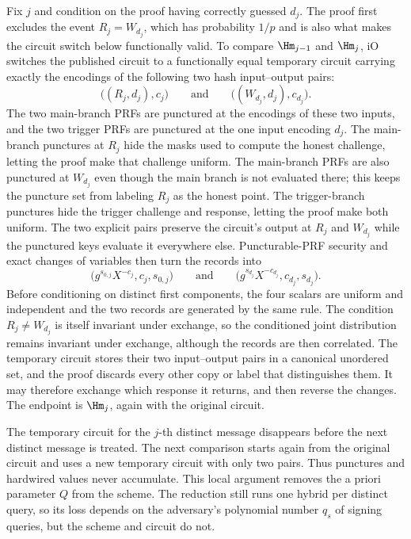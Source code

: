 Fix $j$ and condition on the proof having correctly guessed $d_j$. The proof first excludes the event $R_j=W_{d_j}$, which has probability $1/p$ and is also what makes the circuit switch below functionally valid. To compare $\Hm_{j-1}$ and $\Hm_j$, iO switches the published circuit to a functionally equal temporary circuit carrying exactly the encodings of the following two hash input--output pairs:
$$
\big((R_j,d_j),c_j\big)
\qquad\text{and}\qquad
\big((W_{d_j},d_j),c_{d_j}\big).
$$
The two main-branch PRFs are punctured at the encodings of these two inputs, and the two trigger PRFs are punctured at the one input encoding $d_j$. The main-branch punctures at $R_j$ hide the masks used to compute the honest challenge, letting the proof make that challenge uniform. The main-branch PRFs are also punctured at $W_{d_j}$ even though the main branch is not evaluated there; this keeps the puncture set from labeling $R_j$ as the honest point. The trigger-branch punctures hide the trigger challenge and response, letting the proof make both uniform. The two explicit pairs preserve the circuit's output at $R_j$ and $W_{d_j}$ while the punctured keys evaluate it everywhere else. Puncturable-PRF security and exact changes of variables then turn the records into
$$
\big(g^{s_{0,j}}X^{-c_j},c_j,s_{0,j}\big)
\qquad\text{and}\qquad
\big(g^{s_{d_j}}X^{-c_{d_j}},c_{d_j},s_{d_j}\big).
$$
Before conditioning on distinct first components, the four scalars are uniform and independent and the two records are generated by the same rule. The condition $R_j\ne W_{d_j}$ is itself invariant under exchange, so the conditioned joint distribution remains invariant under exchange, although the records are then correlated. The temporary circuit stores their two input--output pairs in a canonical unordered set, and the proof discards every other copy or label that distinguishes them. It may therefore exchange which response it returns, and then reverse the changes. The endpoint is $\Hm_j$, again with the original circuit.

 The temporary circuit for the $j$-th distinct message disappears before the next distinct message is treated. The next comparison starts again from the original circuit and uses a new temporary circuit with only two pairs. Thus punctures and hardwired values never accumulate. This local argument removes the a priori parameter $Q$ from the scheme. The reduction still runs one hybrid per distinct query, so its loss depends on the adversary's polynomial number $q_s$ of signing queries, but the scheme and circuit do not.

